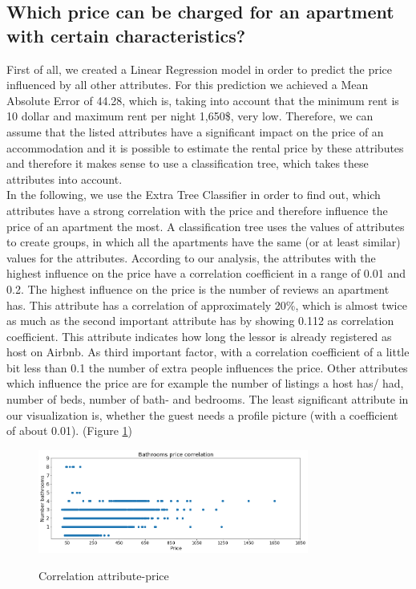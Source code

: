 \documentclass[journal]{IEEEtran}
\begin{document}
\subsection{Which price can be charged for an apartment with certain characteristics?}
First of all, we created a Linear Regression model in order to predict the price influenced by all other attributes. For this prediction we achieved a Mean Absolute Error of 44.28, which is, taking into account that the minimum rent is 10 dollar and maximum rent per night 1,650\$, very low. Therefore, we can assume that the listed attributes have a significant impact on the price of an accommodation and it is possible to estimate the rental price by these attributes and therefore it makes sense to use a classification tree, which takes these attributes into account.\\ In the following, we use the Extra Tree Classifier in order to find out, which attributes have a strong correlation with the price and therefore influence the price of an apartment the most. A classification tree uses the values of attributes to create groups, in which all the apartments have the same (or at least similar) values for the attributes. According to our analysis, the attributes with the highest influence on the price have a correlation coefficient in a range of 0.01 and 0.2. The highest influence on the price is the number of reviews an apartment has. This attribute has a correlation of approximately 20\%, which is almost twice as much as the second important attribute has by showing 0.112 as correlation coefficient. This attribute indicates how long the lessor is already registered as host on Airbnb. As third important factor, with a correlation coefficient of a little bit less than 0.1 the number of extra people influences the price. Other attributes which influence the price are for example the number of listings a host has/ had, number of beds, number of bath- and bedrooms. The least significant attribute in our visualization is, whether the guest needs a profile picture (with a coefficient of about 0.01). (Figure \ref{correlation-attribute-price})
\begin{figure}
  \begin{center}
  \includegraphics[width=3.5in]{photo/9_bathroom_price_correlation.png}\\
  \caption{Correlation attribute-price}\label{correlation-attribute-price}
  \end{center}
\end{figure}
\end{document}
